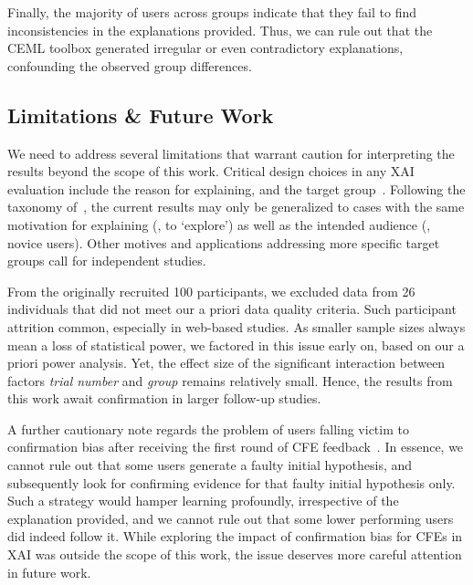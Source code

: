 Finally, the majority of users across groups indicate that they fail to find inconsistencies in the explanations provided.
Thus, we can rule out that the CEML toolbox generated irregular or even contradictory explanations, confounding the observed group differences.

\subsection{Limitations \& Future Work}\label{subsec:limitations-future-work}

We need to address several limitations that warrant caution for interpreting the results beyond the scope of this work.
Critical design choices in any \gls{XAI} evaluation include the reason for explaining, and the target group~\cite{adadi_peeking_2018}.
Following the taxonomy of~\citeauthor{adadi_peeking_2018}, the current results may only be generalized to cases with the same motivation for explaining (\ie, to `explore') as well as the intended audience (\ie, novice users).
Other motives and applications addressing more specific target groups call for independent studies.

From the originally recruited 100 participants, we excluded data from 26 individuals that did not meet our a priori data quality criteria.
Such participant attrition common, especially in web-based studies. 
As smaller sample sizes always mean a loss of statistical power, we factored in this issue early on, based on our a priori power analysis. 
Yet, the effect size of the significant interaction between factors \textit{trial number} and \textit{group} remains relatively small. 
Hence, the results from this work await confirmation in larger follow-up studies.

A further cautionary note regards the problem of users falling victim to confirmation bias after receiving the first round of \gls{CFE} feedback~\citep{wang_designing_2019}. 
In essence, we cannot rule out that some users generate a faulty initial hypothesis, and subsequently look for confirming evidence for that faulty initial hypothesis only. 
Such a strategy would hamper learning profoundly, irrespective of the explanation provided, and we cannot rule out that some lower performing users did indeed follow it.
While exploring the impact of confirmation bias for \glspl{CFE} in \gls{XAI} was outside the scope of this work, the issue deserves more careful attention in future work.

